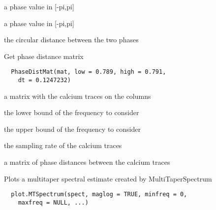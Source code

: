 \documentclass[a4paper]{book}
\begin{document}
%
\begin{Arguments}
\begin{ldescription}
\item[\code{phase1}] a phase value in [-pi,pi]

\item[\code{phase2}] a phase value in [-pi,pi]
\end{ldescription}
\end{Arguments}
%
\begin{Value}
the circular distance between the two phases
\end{Value}
%
\begin{Description}\relax
Get phase distance matrix
\end{Description}
%
\begin{Usage}
\begin{verbatim}
  PhaseDistMat(mat, low = 0.789, high = 0.791,
    dt = 0.1247232)
\end{verbatim}
\end{Usage}
%
\begin{Arguments}
\begin{ldescription}
\item[\code{mat}] a matrix with the calcium traces on the
columns

\item[\code{low}] the lower bound of the frequency to consider

\item[\code{high}] the upper bound of the frequency to consider

\item[\code{dt}] the sampling rate of the calcium traces
\end{ldescription}
\end{Arguments}
%
\begin{Value}
a matrix of phase distances between the calcium traces
\end{Value}
%
\begin{Description}\relax
Plots a multitaper spectral estimate created by
MultiTaperSpectrum
\end{Description}
%
\begin{Usage}
\begin{verbatim}
  plot.MTSpectrum(spect, maglog = TRUE, minfreq = 0,
    maxfreq = NULL, ...)
\end{verbatim}
\end{Usage}
\end{document}
